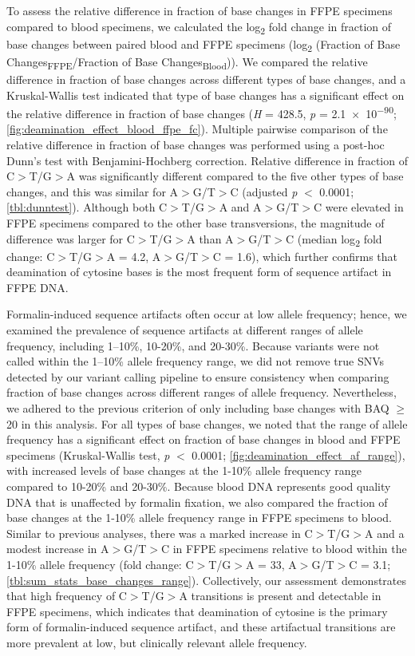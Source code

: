 To assess the relative difference in fraction of base changes in FFPE specimens compared to blood specimens, we calculated the log\textsubscript{2} fold change in fraction of base changes between paired blood and FFPE specimens (log\textsubscript{2} (Fraction of Base Changes\textsubscript{FFPE}/Fraction of Base Changes\textsubscript{Blood})). We compared the relative difference in fraction of base changes across different types of base changes, and a Kruskal-Wallis test indicated that type of base changes has a significant effect on the relative difference in fraction of base changes (\textit{H} = 428.5, \textit{p} = \num{2.1e-90}; \autoref{fig:deamination_effect_blood_ffpe_fc}). Multiple pairwise comparison of the relative difference in fraction of base changes was performed using a post-hoc Dunn's test with Benjamini-Hochberg correction. Relative difference in fraction of C$>$T/G$>$A was significantly different compared to the five other types of base changes, and this was similar for A$>$G/T$>$C (adjusted \textit{p} $<$ 0.0001; \autoref{tbl:dunntest}). Although both C$>$T/G$>$A and A$>$G/T$>$C were elevated in FFPE specimens compared to the other base transversions, the magnitude of difference was larger for C$>$T/G$>$A than A$>$G/T$>$C (median log\textsubscript{2} fold change: C$>$T/G$>$A = 4.2, A$>$G/T$>$C = 1.6), which further confirms that deamination of cytosine bases is the most frequent form of sequence artifact in FFPE DNA.

Formalin-induced sequence artifacts often occur at low allele frequency; hence, we examined the prevalence of sequence artifacts at different ranges of allele frequency, including 1--10\%, 10-20\%, and 20-30\%. Because variants were not called within the 1--10\% allele frequency range, we did not remove true SNVs detected by our variant calling pipeline to ensure consistency when comparing fraction of base changes across different ranges of allele frequency. Nevertheless, we adhered to the previous criterion of only including base changes with BAQ $\geq$ 20 in this analysis. For all types of base changes, we noted that the range of allele frequency has a significant effect on fraction of base changes in blood and FFPE specimens (Kruskal-Wallis test, \textit{p} $<$ 0.0001; \autoref{fig:deamination_effect_af_range}), with increased levels of base changes at the 1-10\% allele frequency range compared to 10-20\% and 20-30\%. Because blood DNA represents good quality DNA that is unaffected by formalin fixation, we also compared the fraction of base changes at the 1-10\% allele frequency range in FFPE specimens to blood. Similar to previous analyses, there was a marked increase in C$>$T/G$>$A and a modest increase in A$>$G/T$>$C in FFPE specimens relative to blood within the 1-10\% allele frequency (fold change: C$>$T/G$>$A = 33, A$>$G/T$>$C = 3.1; \autoref{tbl:sum_stats_base_changes_range}). Collectively, our assessment demonstrates that high frequency of C$>$T/G$>$A transitions is present and detectable in FFPE specimens, which indicates that deamination of cytosine is the primary form of formalin-induced sequence artifact, and these artifactual transitions are more prevalent at low, but clinically relevant allele frequency.

